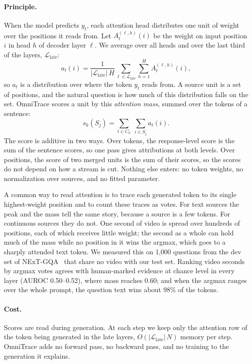 \paragraph{Principle.}
When the model predicts $y_t$, each attention head distributes one unit of weight over the positions it reads from.
Let $A^{(\ell,h)}_t(i)$ be the weight on input position $i$ in head $h$ of decoder layer $\ell$.
We average over all heads and over the last third of the layers, $\mathcal{L}_{\text{late}}$:
\begin{equation}
a_t(i)=\frac{1}{|\mathcal{L}_{\text{late}}|\,H}\sum_{\ell\in\mathcal{L}_{\text{late}}}\sum_{h=1}^{H}A^{(\ell,h)}_t(i),
\end{equation}
so $a_t$ is a distribution over where the token $y_t$ reads from.
A source unit is a set of positions, and the natural question is how much of this distribution falls on the set.
OmniTrace scores a unit by this \emph{attention mass}, summed over the tokens of a sentence:
\begin{equation}
s_k(S_j)=\sum_{t\in C_k}\;\sum_{i\in S_j} a_t(i).
\label{eq:mass}
\end{equation}
The score is additive in two ways. Over tokens, the response-level score is the sum of the sentence scores, so one pass gives attributions at both levels. Over positions, the score of two merged units is the sum of their scores, so the scores do not depend on how a stream is cut.
Nothing else enters: no token weights, no normalization over sources, and no fitted parameter.

\label{sec:design}
A common way to read attention is to trace each generated token to its single highest-weight position and to count these traces as votes.
For text sources the peak and the mass tell the same story, because a source is a few tokens.
For continuous sources they do not. One second of video is spread over hundreds of positions, each of which receives little weight; the second as a whole can hold much of the mass while no position in it wins the argmax, which goes to a sharply attended text token.
We measured this on 1{,}000 questions from the dev set of NExT-GQA~\cite{xiao2024nextgqa} that share no video with our test set.
Ranking video seconds by argmax votes agrees with human-marked evidence at chance level in every layer (AUROC 0.50--0.52), where mass reaches 0.60; and when the argmax ranges over the whole prompt, the question text wins about 98\% of the tokens.

\paragraph{Cost.}
Scores are read during generation. At each step we keep only the attention row of the token being generated in the late layers, $O(|\mathcal{L}_{\text{late}}|\,N)$ memory per step.
OmniTrace adds no forward pass, no backward pass, and no training to the generation it explains.

